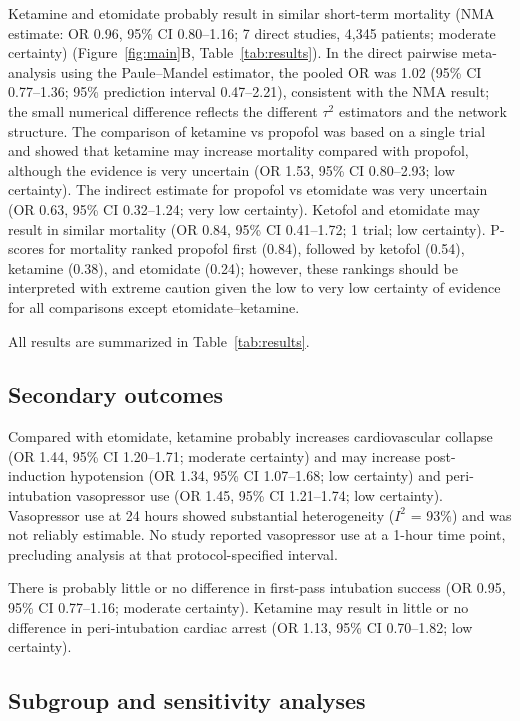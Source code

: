 \documentclass[11pt]{article}
\begin{document}
Ketamine and etomidate probably result in similar short-term mortality (NMA estimate: OR 0.96, 95\% CI 0.80--1.16; 7 direct studies, 4,345 patients; moderate certainty) (Figure~\ref{fig:main}B, Table~\ref{tab:results}). In the direct pairwise meta-analysis using the Paule--Mandel estimator, the pooled OR was 1.02 (95\% CI 0.77--1.36; 95\% prediction interval 0.47--2.21), consistent with the NMA result; the small numerical difference reflects the different $\tau^2$ estimators and the network structure. The comparison of ketamine vs propofol was based on a single trial and showed that ketamine may increase mortality compared with propofol, although the evidence is very uncertain (OR 1.53, 95\% CI 0.80--2.93; low certainty). The indirect estimate for propofol vs etomidate was very uncertain (OR 0.63, 95\% CI 0.32--1.24; very low certainty). Ketofol and etomidate may result in similar mortality (OR 0.84, 95\% CI 0.41--1.72; 1 trial; low certainty). P-scores for mortality ranked propofol first (0.84), followed by ketofol (0.54), ketamine (0.38), and etomidate (0.24); however, these rankings should be interpreted with extreme caution given the low to very low certainty of evidence for all comparisons except etomidate--ketamine.

All results are summarized in Table~\ref{tab:results}.

\subsection{Secondary outcomes}

Compared with etomidate, ketamine probably increases cardiovascular collapse (OR 1.44, 95\% CI 1.20--1.71; moderate certainty) and may increase post-induction hypotension (OR 1.34, 95\% CI 1.07--1.68; low certainty) and peri-intubation vasopressor use (OR 1.45, 95\% CI 1.21--1.74; low certainty). Vasopressor use at 24 hours showed substantial heterogeneity ($I^2$ = 93\%) and was not reliably estimable. No study reported vasopressor use at a 1-hour time point, precluding analysis at that protocol-specified interval.

There is probably little or no difference in first-pass intubation success (OR 0.95, 95\% CI 0.77--1.16; moderate certainty). Ketamine may result in little or no difference in peri-intubation cardiac arrest (OR 1.13, 95\% CI 0.70--1.82; low certainty).

\subsection{Subgroup and sensitivity analyses}
\end{document}
